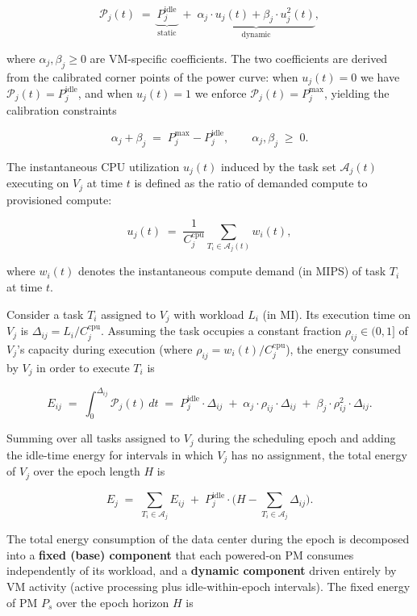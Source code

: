\documentclass[11pt,a4paper]{article}
\begin{document}
$$
\mathcal{P}_j(t) \;=\; \underbrace{P^{\text{idle}}_j}_{\text{static}} \;+\; \underbrace{\alpha_j \cdot u_j(t) + \beta_j \cdot u_j^2(t)}_{\text{dynamic}},
$$

where $\alpha_j, \beta_j \geq 0$ are VM-specific coefficients. The two coefficients are derived from the calibrated corner points of the power curve: when $u_j(t) = 0$ we have $\mathcal{P}_j(t) = P^{\text{idle}}_j$, and when $u_j(t) = 1$ we enforce $\mathcal{P}_j(t) = P^{\text{max}}_j$, yielding the calibration constraints

$$
\alpha_j + \beta_j \;=\; P^{\text{max}}_j - P^{\text{idle}}_j, \qquad \alpha_j, \beta_j \;\geq\; 0.
$$

The instantaneous CPU utilization $u_j(t)$ induced by the task set $\mathcal{A}_j(t)$ executing on $V_j$ at time $t$ is defined as the ratio of demanded compute to provisioned compute:

$$
u_j(t) \;=\; \frac{1}{C^{\text{cpu}}_j} \sum_{T_i \in \mathcal{A}_j(t)} w_i(t),
$$

where $w_i(t)$ denotes the instantaneous compute demand (in MIPS) of task $T_i$ at time $t$.

Consider a task $T_i$ assigned to $V_j$ with workload $L_i$ (in MI). Its execution time on $V_j$ is $\Delta_{ij} = L_i / C^{\text{cpu}}_j$. Assuming the task occupies a constant fraction $\rho_{ij} \in (0, 1]$ of $V_j$'s capacity during execution (where $\rho_{ij} = w_i(t)/C^{\text{cpu}}_j$), the energy consumed by $V_j$ in order to execute $T_i$ is

$$
E_{ij} \;=\; \int_{0}^{\Delta_{ij}} \! \mathcal{P}_j(t)\, dt
\;=\; P^{\text{idle}}_j \cdot \Delta_{ij} \;+\; \alpha_j \cdot \rho_{ij} \cdot \Delta_{ij} \;+\; \beta_j \cdot \rho_{ij}^2 \cdot \Delta_{ij}.
$$

Summing over all tasks assigned to $V_j$ during the scheduling epoch and adding the idle-time energy for intervals in which $V_j$ has no assignment, the total energy of $V_j$ over the epoch length $H$ is

$$
E_j \;=\; \sum_{T_i \in \mathcal{A}_j} E_{ij} \;+\; P^{\text{idle}}_j \cdot \Big( H - \sum_{T_i \in \mathcal{A}_j} \Delta_{ij} \Big).
$$

The total energy consumption of the data center during the epoch is decomposed into a \textbf{fixed (base) component} that each powered-on PM consumes independently of its workload, and a \textbf{dynamic component} driven entirely by VM activity (active processing plus idle-within-epoch intervals). The fixed energy of PM $P_s$ over the epoch horizon $H$ is
\end{document}
